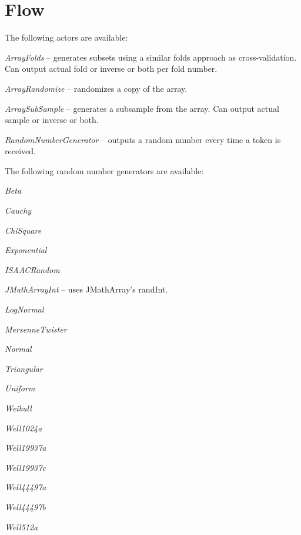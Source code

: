 \documentclass[a4paper]{book}
\begin{document}
\chapter{Flow}
The following actors are available:
\begin{tight_itemize}
	\item \textit{ArrayFolds} -- generates subsets using a similar folds 
	approach as cross-validation. Can output actual fold or inverse or both
	per fold number.
	\item \textit{ArrayRandomize} -- randomizes a copy of the array.
	\item \textit{ArraySubSample} -- generates a subsample from the array.
	Can output actual sample or inverse or both.
	\item \textit{RandomNumberGenerator} -- outputs a random number every
	time a token is received.
\end{tight_itemize}
The following random number generators are available:
\begin{tight_itemize}
	\item \textit{Beta}
	\item \textit{Cauchy}
	\item \textit{ChiSquare}
	\item \textit{Exponential}
	\item \textit{ISAACRandom}
	\item \textit{JMathArrayInt} -- uses JMathArray's randInt.
	\item \textit{LogNormal}
	\item \textit{MersenneTwister}
	\item \textit{Normal}
	\item \textit{Triangular}
	\item \textit{Uniform}
	\item \textit{Weibull}
	\item \textit{Well1024a}
	\item \textit{Well19937a}
	\item \textit{Well19937c}
	\item \textit{Well44497a}
	\item \textit{Well44497b}
	\item \textit{Well512a}
\end{tight_itemize}


\end{document}
